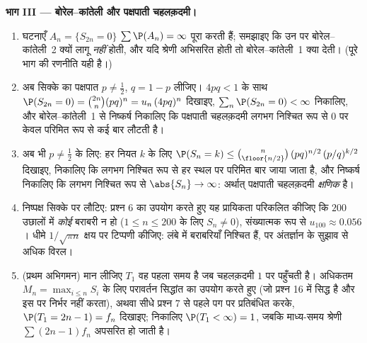 \begin{problem}
\medskip
\noindent\textbf{भाग III --- बोरेल--कांतेली और पक्षपाती
चहलक़दमी।}
\begin{enumerate}[resume]
  \item घटनाएँ $A_n = \{S_{2n} = 0\}$ $\sum\P(A_n)
        = \infty$ पूरा करती हैं; समझाइए कि उन पर
        बोरेल--कांतेली~2 क्यों लागू \emph{नहीं} होती, और यदि
        श्रेणी अभिसरित होती तो बोरेल--कांतेली~1 क्या देती। (पूरे
        भाग की रणनीति यही है।)
  \item अब सिक्के का पक्षपात $p \neq \frac12$, $q = 1 -
        p$ लीजिए। $4pq < 1$ के साथ $\P(S_{2n} = 0) = \binom{2n}n(pq)^n =
        u_n\,(4pq)^n$
        दिखाइए, $\sum_n\P(S_{2n} = 0) < \infty$ निकालिए, और बोरेल--कांतेली~1 से निष्कर्ष
        निकालिए कि पक्षपाती चहलक़दमी लगभग निश्चित रूप से $0$ पर
        केवल परिमित रूप से कई बार लौटती है।
  \item अब भी $p \neq \frac12$ के लिए: हर नियत $k$ के लिए $\P(S_n = k) \leq
        \binom{n}{\floor{n/2}}\,(pq)^{n/2}\,(p/q)^{k/2}$ दिखाइए,
        निकालिए कि लगभग निश्चित रूप से हर स्थल पर परिमित बार
        जाया जाता है, और निष्कर्ष निकालिए कि लगभग निश्चित रूप
        से $\abs{S_n} \to \infty$: अर्थात् पक्षपाती चहलक़दमी \emph{क्षणिक} है।
  \item निष्पक्ष सिक्के पर लौटिए: प्रश्न 6 का उपयोग करते हुए
        यह प्रायिकता परिकलित कीजिए कि $200$ उछालों में
        \emph{कोई} बराबरी न हो ($1 \leq n \leq 200$ के लिए $S_n \neq 0$), संख्यात्मक
        रूप से $u_{100} \approx 0.056$। धीमे $1/\sqrt{\pi n}$ क्षय पर टिप्पणी कीजिए: लंबे में
        बराबरियाँ निश्चित हैं, पर अंतर्ज्ञान के सुझाव से अधिक
        विरल।
  \item (प्रथम अभिगमन) मान लीजिए $T_1$ वह पहला समय है जब
        चहलक़दमी $1$ पर पहुँचती है। अधिकतम $M_n = \max_{i\leq n}S_i$ के लिए
        परावर्तन सिद्धांत का उपयोग करते हुए (जो प्रश्न 16 में
        सिद्ध है और इस पर निर्भर नहीं करता), अथवा सीधे प्रश्न 7
        से पहले पग पर प्रतिबंधित करके, $\P(T_1 = 2n - 1) = f_n$ दिखाइए; निकालिए
        $\P(T_1 <
        \infty) = 1$, जबकि माध्य-समय श्रेणी $\sum(2n-1)f_n$ अपसरित हो जाती है।
\end{enumerate}


\end{problem}
